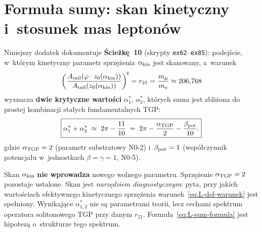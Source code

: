 \section{Formuła sumy: skan kinetyczny i~stosunek mas leptonów}%
\label{app:formula-sumy}

Niniejszy dodatek dokumentuje \textbf{Ścieżkę~10} (skrypty
\texttt{ex62}--\texttt{ex85}): podejście, w~którym kinetyczny parametr
sprzężenia $\alpha_{\rm kin}$ jest skanowany, a~warunek
\begin{equation}\label{eq:L-def-warunek}
  \left(\frac{A_{\rm tail}(\varphi \cdot z_0(\alpha_{\rm kin}))}
              {A_{\rm tail}(z_0(\alpha_{\rm kin}))}\right)^{\!4}
  = r_{21} = \frac{m_\mu}{m_e} \approx 206{,}768
\end{equation}
wyznacza \textbf{dwie krytyczne wartości} $\alpha^*_1$, $\alpha^*_2$,
których suma jest zbliżona do prostej kombinacji stałych fundamentalnych TGP:
\begin{equation}\label{eq:L-sum-formula}
  \boxed{\alpha^*_1 + \alpha^*_2
  \;\approx\; 2\pi - \frac{11}{10}
  \;=\; 2\pi - \frac{\alpha_{\rm TGP}}{2} - \frac{\beta_{\rm pot}}{10}.}
\end{equation}
gdzie $\alpha_{\rm TGP} = 2$ (parametr substratowy N0-2) i~$\beta_{\rm pot} = 1$
(współczynnik potencjału w~jednostkach $\beta = \gamma = 1$, N0-5).

\medskip
\noindent{}
\medskip

\begin{remark}
Skan $\alpha_{\rm kin}$ \textbf{nie wprowadza} nowego wolnego parametru.
Sprzężenie $\alpha_{\rm TGP} = 2$ pozostaje ustalone. Skan jest
\emph{narzędziem diagnostycznym}: pyta, przy jakich wartościach efektywnego
kinetycznego sprzężenia warunek~\eqref{eq:L-def-warunek} jest spełniony.
Wynikające $\alpha^*_{1,2}$ nie są parametrami teorii, lecz cechami spektrum
operatora solitonowego TGP przy danym $r_{21}$. Formuła~\eqref{eq:L-sum-formula}
jest hipotezą o~strukturze tego spektrum.
\end{remark}

